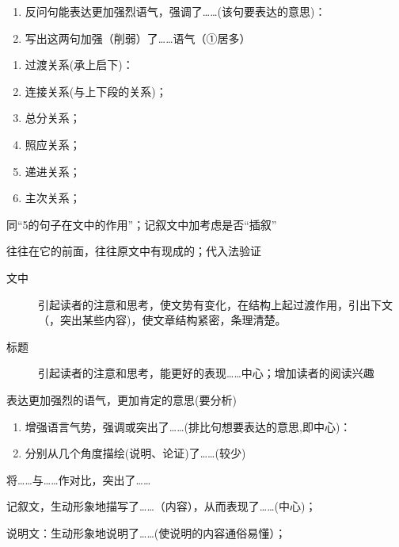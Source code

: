 \begin{enumerate}
\item 反问句能表达更加强烈语气，强调了\ldots{}\ldots{}(该句要表达的意思)：
\item 写出这两句加强（削弱）了\ldots{}\ldots{}语气（①居多）
\end{enumerate}

\begin{enumerate}
\item 过渡关系(承上启下)：
\item 连接关系(与上下段的关系)；
\item 总分关系；
\item 照应关系；
\item 递进关系；
\item 主次关系；
\end{enumerate}

同``5的句子在文中的作用''；记叙文中加考虑是否``插叙''

往往在它的前面，往往原文中有现成的；代入法验证

\begin{description}
\item[文中]引起读者的注意和思考，使文势有变化，在结构上起过渡作用，引出下文（，突出某些内容)，使文章结构紧密，条理清楚。
\item[标题]引起读者的注意和思考，能更好的表现\ldots{}\ldots{}中心；增加读者的阅读兴趣
\end{description}

表达更加强烈的语气，更加肯定的意思(要分析)

\begin{enumerate}
\item 增强语言气势，强调或突出了\ldots{}\ldots{}(排比句想要表达的意思,即中心)：
\item 分别从几个角度描绘(说明、论证)了\ldots{}\ldots{}(较少)
\end{enumerate}

将\ldots{}\ldots{}与\ldots{}\ldots{}作对比，突出了\ldots{}\ldots{}

记叙文，生动形象地描写了\ldots{}\ldots{}（内容），从而表现了\ldots{}\ldots{}(中心)；

说明文：生动形象地说明了\ldots{}\ldots{}(使说明的内容通俗易懂）；

